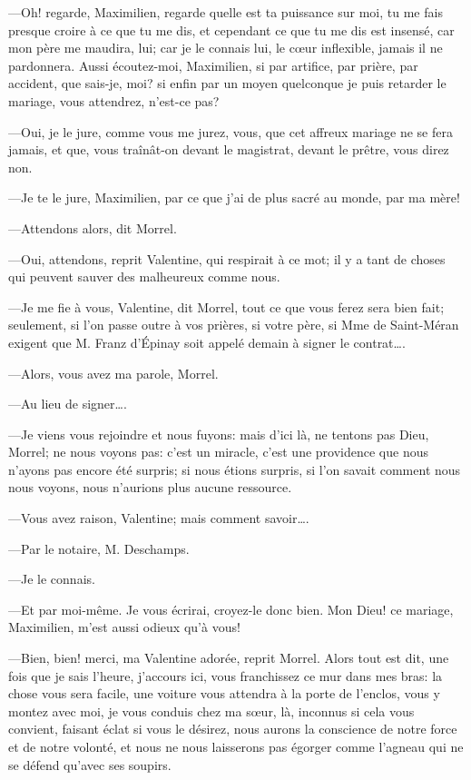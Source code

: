 —Oh! regarde, Maximilien, regarde quelle est ta puissance sur moi, tu me fais presque croire à ce que tu me dis, et cependant ce que tu me dis est insensé, car mon père me maudira, lui; car je le connais lui, le cœur inflexible, jamais il ne pardonnera. Aussi écoutez-moi, Maximilien, si par artifice, par prière, par accident, que sais-je, moi? si enfin par un moyen quelconque je puis retarder le mariage, vous attendrez, n'est-ce pas? 

—Oui, je le jure, comme vous me jurez, vous, que cet affreux mariage ne se fera jamais, et que, vous traînât-on devant le magistrat, devant le prêtre, vous direz non. 

—Je te le jure, Maximilien, par ce que j'ai de plus sacré au monde, par ma mère! 

—Attendons alors, dit Morrel. 

—Oui, attendons, reprit Valentine, qui respirait à ce mot; il y a tant de choses qui peuvent sauver des malheureux comme nous. 

—Je me fie à vous, Valentine, dit Morrel, tout ce que vous ferez sera bien fait; seulement, si l'on passe outre à vos prières, si votre père, si Mme de Saint-Méran exigent que M. Franz d'Épinay soit appelé demain à signer le contrat\dots. 

—Alors, vous avez ma parole, Morrel. 

—Au lieu de signer\dots. 

—Je viens vous rejoindre et nous fuyons: mais d'ici là, ne tentons pas Dieu, Morrel; ne nous voyons pas: c'est un miracle, c'est une providence que nous n'ayons pas encore été surpris; si nous étions surpris, si l'on savait comment nous nous voyons, nous n'aurions plus aucune ressource. 

—Vous avez raison, Valentine; mais comment savoir\dots. 

—Par le notaire, M. Deschamps. 

—Je le connais. 

—Et par moi-même. Je vous écrirai, croyez-le donc bien. Mon Dieu! ce mariage, Maximilien, m'est aussi odieux qu'à vous! 

—Bien, bien! merci, ma Valentine adorée, reprit Morrel. Alors tout est dit, une fois que je sais l'heure, j'accours ici, vous franchissez ce mur dans mes bras: la chose vous sera facile, une voiture vous attendra à la porte de l'enclos, vous y montez avec moi, je vous conduis chez ma sœur, là, inconnus si cela vous convient, faisant éclat si vous le désirez, nous aurons la conscience de notre force et de notre volonté, et nous ne nous laisserons pas égorger comme l'agneau qui ne se défend qu'avec ses soupirs. 

